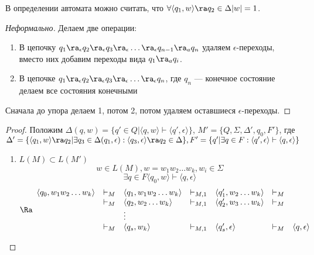 \begin{theorem}
    В определении автомата можно считать, что \(\forall \langle q_1, w \rangle \ra q_2 \in \Delta |w| = 1\).
\end{theorem}
\begin{proof}[Неформально]
    Делаем две операции:
    \begin{enumerate}
        \item В цепочку \(q_1 \ra_\epsilon q_2 \ra_\epsilon q_3 \ra_\epsilon \dots \ra_\epsilon q_{n - 1} \ra_a q_n\) удаляем \(\epsilon\)-переходы, вместо них добавим переходы вида \(q_1 \ra_a q_i\).
        
        \item В цепочке \(q_1 \ra_\epsilon q_2 \ra_\epsilon q_3 \ra_\epsilon \dots \ra_\epsilon  q_n\), где \(q_n\) --- конечное состояние делаем все состояния конечными
    \end{enumerate}
    Сначала до упора делаем 1, потом 2, потом удаляем оставшиеся \(\epsilon\)-переходы.
\end{proof}
\begin{proof}
    Положим \(\Delta(q, w) = \{q' \in Q | \langle q, w\rangle \vdash \langle q', \epsilon\rangle\}\), \(M' = \{Q, \Sigma, \Delta', q_0, F'\}\), где \(\Delta' = \{\langle q_1, w\rangle \ra q_2 | \exists q_3 \in \Delta(q_1, \epsilon): \langle q_3, \epsilon\rangle \ra q_2 \in \Delta\}, F' = \{q' | \exists q \in F: \langle q', \epsilon\rangle \vdash \langle q, \epsilon\rangle\}\)

    \begin{enumerate}
        \item \(L(M) \subset L(M')\)
        \[w \in L(M), w = w_1w_2\dots w_k, w_i \in \Sigma\]
        \[\exists q \in F \langle q_0, w\rangle \vdash \langle q, \epsilon\rangle\]
        \[\Ra \begin{array}{lclclcl}
            \langle q_0, w_1w_2\dots w_k\rangle & \vdash_{M} & \langle q_1, w_1w_2\dots w_k\rangle & \vdash_{M, 1} & \langle q_1', w_2\dots w_k\rangle & \vdash_M \\
            
            & \vdash_{M} & \langle q_2, w_2\dots w_k\rangle & \vdash_{M, 1} & \langle q_2', w_3\dots w_k\rangle & \vdash_M \\
            
            & & \vdots & & & \\

            & \vdash_{M} & \langle q_s, w_k\rangle & \vdash_{M, 1} & \langle q_s', \epsilon\rangle & \vdash_M  &\langle q, \epsilon\rangle\\
        \end{array}\]
    \end{enumerate}
\end{proof}
